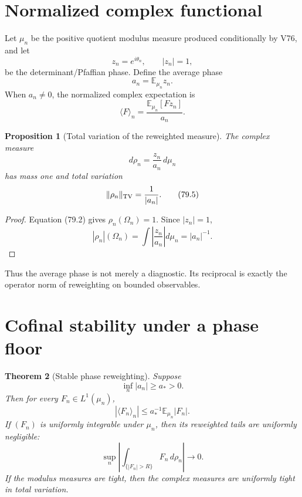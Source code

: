 \documentclass[11pt]{article}
\newtheorem{theorem}{Theorem}[section]
\newtheorem{proposition}[theorem]{Proposition}
\theoremstyle{remark}
\begin{document}
\section{Normalized complex functional}

Let \(\mu_n\) be the positive quotient modulus measure produced
conditionally by V76, and let
\[
 z_n=e^{i\theta_n},\qquad |z_n|=1,                    \tag{79.1}
\]
be the determinant/Pfaffian phase.  Define the average phase
\[
 a_n=\mathbb E_{\mu_n}z_n.                            \tag{79.2}
\]
When \(a_n\ne0\), the normalized complex expectation is
\[
 \langle F\rangle_n
 =
 \frac{\mathbb E_{\mu_n}[Fz_n]}{a_n}.                 \tag{79.3}
\]

\begin{proposition}[Total variation of the reweighted measure]
\label{prop:v15v79-variation}
The complex measure
\[
 d\rho_n=\frac{z_n}{a_n}\,d\mu_n                     \tag{79.4}
\]
has mass one and total variation
\[
 \|\rho_n\|_{\rm TV}=\frac1{|a_n|}.                   \tag{79.5}
\]
\end{proposition}

\begin{proof}
Equation (79.2) gives
\(\rho_n(\Omega_n)=1\).  Since \(|z_n|=1\),
\[
 |\rho_n|(\Omega_n)
 =
 \int\left|\frac{z_n}{a_n}\right|d\mu_n
 =
 |a_n|^{-1}.
\]
\end{proof}

Thus the average phase is not merely a diagnostic.  Its reciprocal
is exactly the operator norm of reweighting on bounded
observables.

\section{Cofinal stability under a phase floor}

\begin{theorem}[Stable phase reweighting]
\label{thm:v15v79-stable}
Suppose
\[
 \inf_n|a_n|\geq a_*>0.                               \tag{79.6}
\]
Then for every \(F_n\in L^1(\mu_n)\),
\[
 |\langle F_n\rangle_n|
 \leq a_*^{-1}\mathbb E_{\mu_n}|F_n|.                 \tag{79.7}
\]
If \((F_n)\) is uniformly integrable under \(\mu_n\), then its
reweighted tails are uniformly negligible:
\[
 \sup_n
 \left|
 \int_{\{|F_n|>R\}}F_n\,d\rho_n
 \right|
 \longrightarrow0.                                   \tag{79.8}
\]
If the modulus measures are tight, then the complex measures are
uniformly tight in total variation.
\end{theorem}
\end{document}
